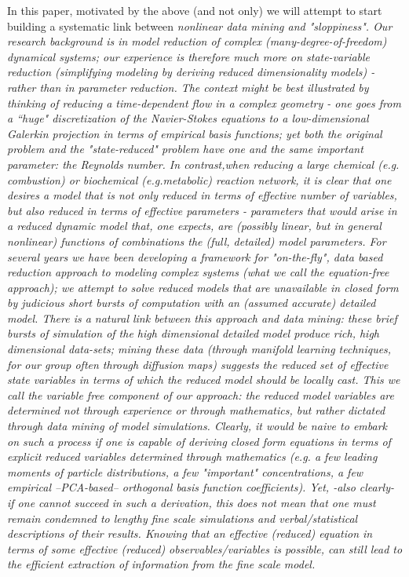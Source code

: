 \documentclass{article}
\begin{document}
In this paper, motivated by the above (and not only) we will attempt to start building a
systematic link between \em{nonlinear} data mining and "sloppiness".
%
Our research background is in model reduction of complex (many-degree-of-freedom) dynamical systems;
our experience is therefore much more on state-variable reduction
(simplifying modeling by deriving reduced dimensionality models) - rather than in \em{parameter reduction}.
%
The context might be best illustrated by thinking of reducing a time-dependent
flow in a complex geometry - one goes from a ``huge" discretization of the Navier-Stokes equations to a
low-dimensional Galerkin projection in terms of empirical basis functions;
yet both the original problem and the "state-reduced" problem have \em{one and the same} important parameter:
the Reynolds number.
%
In contrast,when reducing a large chemical (e.g. combustion) or biochemical (e.g.metabolic) reaction network, it is clear
that one desires a model that is not only reduced in terms of effective number of variables,
but also reduced in terms of effective parameters - parameters that would arise in a
reduced dynamic model that, one expects, are (possibly linear, but in general nonlinear) functions of
combinations the (full, detailed) model parameters.
%
For several years we have been developing a framework for "on-the-fly", data based reduction approach to
modeling complex systems (what we call the equation-free approach);
we attempt to solve reduced models that are unavailable in closed form by
judicious short bursts of computation with an (assumed accurate) detailed model.
%
There is a natural link between this approach and data mining: these brief bursts
of simulation of the high dimensional detailed model produce rich, high dimensional
data-sets; mining these data (through manifold learning techniques, for our group often through diffusion maps)
suggests the reduced set of \em{effective state variables} in terms of which the reduced model should be locally cast.
%
This we call the \em{variable free} component of our approach: the reduced model variables are
determined not through experience or through mathematics, but rather dictated through data mining of model simulations.
%
Clearly, it would be naive to embark on such a process if one is capable of deriving closed form equations in
terms of explicit reduced variables determined through mathematics (e.g. a few leading moments of particle distributions,
a few "important" concentrations, a few empirical --PCA-based-- orthogonal basis function coefficients).
%
Yet, -also clearly- if one cannot succeed in such a derivation, this does not mean that one must
remain condemned to lengthy fine scale simulations and verbal/statistical descriptions of their results.
%
Knowing that an effective (reduced) equation in terms of some effective (reduced) observables/variables is
possible, can still lead to the efficient extraction of information from the fine scale model.
\end{document}
